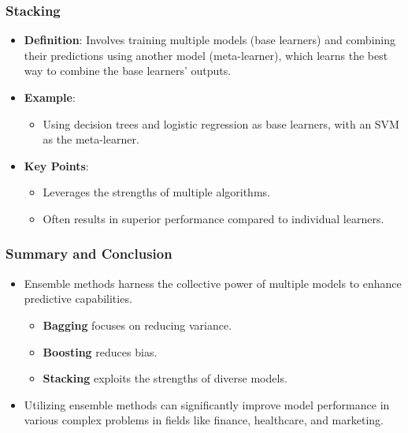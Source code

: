 \documentclass[aspectratio=169]{beamer}
\begin{document}
\begin{frame}
    \frametitle{Stacking}
    \begin{itemize}
        \item \textbf{Definition}: Involves training multiple models (base learners) and combining their predictions using another model (meta-learner), which learns the best way to combine the base learners' outputs.
        
        \item \textbf{Example}: 
        \begin{itemize}
            \item Using decision trees and logistic regression as base learners, with an SVM as the meta-learner.
        \end{itemize}
        
        \item \textbf{Key Points}:
        \begin{itemize}
            \item Leverages the strengths of multiple algorithms.
            \item Often results in superior performance compared to individual learners.
        \end{itemize}
    \end{itemize}
\end{frame}

\begin{frame}
    \frametitle{Summary and Conclusion}
    \begin{itemize}
        \item Ensemble methods harness the collective power of multiple models to enhance predictive capabilities.
        \begin{itemize}
            \item \textbf{Bagging} focuses on reducing variance.
            \item \textbf{Boosting} reduces bias.
            \item \textbf{Stacking} exploits the strengths of diverse models.
        \end{itemize}
        
        \item Utilizing ensemble methods can significantly improve model performance in various complex problems in fields like finance, healthcare, and marketing.
    \end{itemize}
\end{frame}
\end{document}
